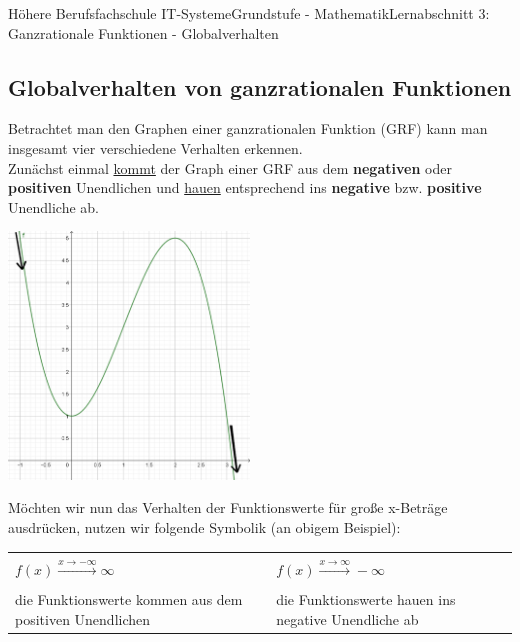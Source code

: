 \documentclass[11pt,twocolumn,oneside,openany,headings=optiontotoc,11pt,numbers=noenddot]{article}
\begin{document}
	\begin{worksheet}{Höhere Berufsfachschule IT-Systeme}{Grundstufe - Mathematik}{Lernabschnitt 3: Ganzrationale Funktionen - Globalverhalten}
		\setcounter{section}{6}
		\setcounter{subsection}{2}
		\subsection{Globalverhalten von ganzrationalen Funktionen}
		Betrachtet man den Graphen einer ganzrationalen Funktion (GRF) kann man insgesamt vier verschiedene Verhalten erkennen.\\
		Zunächst einmal \underline{kommt} der Graph einer GRF aus dem \textbf{negativen} oder \textbf{positiven} Unendlichen und \underline{hauen} entsprechend ins \textbf{negative} bzw. \textbf{positive} Unendliche ab.\\
		\par\noindent
		\includegraphics[width=0.48\textwidth]{../99_Bilder/03-1_gVerh.png}\\
		\par\noindent
		Möchten wir nun das Verhalten der Funktionswerte für große x-Beträge ausdrücken, nutzen wir folgende Symbolik (an obigem Beispiel):\\
		\par\noindent
		\begin{tabularx}{0.48\textwidth}{X|X}
			\hline
			& \\
			\(f(x) \xrightarrow{x\rightarrow-\infty}\infty\) & \(f(x) \xrightarrow{x\rightarrow\infty}-\infty\)\\
			\\
			die Funktionswerte kommen aus dem positiven Unendlichen & die Funktionswerte hauen ins negative Unendliche ab\\
			\hline
		\end{tabularx}\\
		\par\noindent

\end{worksheet}
\end{document}
